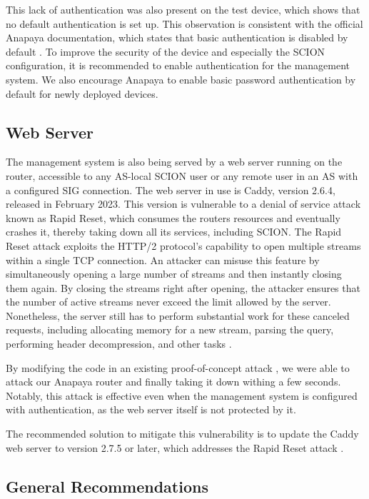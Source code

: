 This lack of authentication was also present on the test device, which shows that no default authentication is set up.
This observation is consistent with the official Anapaya documentation, which states that basic authentication is disabled by default \cite{anapayaManagemenDoc}.
To improve the security of the device and especially the SCION configuration, it is recommended to enable authentication for the management system.
We also encourage Anapaya to enable basic password authentication by default for newly deployed devices.


\subsection{Web Server}
\label{sec:web-server}
The management system is also being served by a web server running on the router, accessible to any AS-local SCION user or any remote user in an AS with a configured SIG connection.
The web server in use is Caddy, version 2.6.4, released in February 2023.
This version is vulnerable to a denial of service attack known as Rapid Reset, which consumes the routers resources and eventually crashes it, thereby taking down all its services, including SCION.
The Rapid Reset attack exploits the HTTP/2 protocol's capability to open multiple streams within a single TCP connection.
An attacker can misuse this feature by simultaneously opening a large number of streams and then instantly closing them again.
By closing the streams right after opening, the attacker ensures that the number of active streams never exceed the limit allowed by the server.
Nonetheless, the server still has to perform substantial work for these canceled requests, including allocating memory for a new stream, parsing the query, performing header decompression, and other tasks \cite{googleWorksNovel}.

By modifying the code in an existing proof-of-concept attack \cite{githubGitHubMicrictorhttp2rststream}, we were able to attack our Anapaya router and finally taking it down withing a few seconds.
Notably, this attack is effective even when the management system is configured with authentication, as the web server itself is not protected by it.

The recommended solution to mitigate this vulnerability is to update the Caddy web server to version 2.7.5 or later, which addresses the Rapid Reset attack \cite{githubReleasesCaddyservercaddy}.



\subsection{General Recommendations}
\label{sec:general-recommendations}

